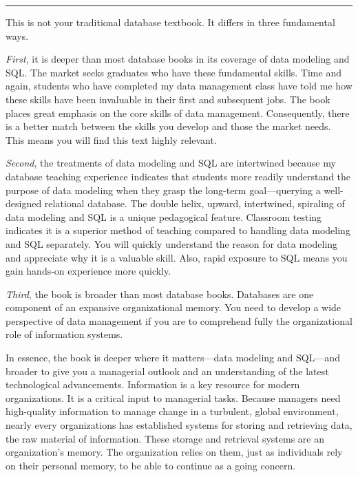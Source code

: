 \documentclass[
]{article}
\begin{document}
\begin{center}\rule{0.5\linewidth}{0.5pt}\end{center}

This is not your traditional database textbook. It differs in three
fundamental ways.

\emph{First}, it is deeper than most database books in its coverage of
data modeling and SQL. The market seeks graduates who have these
fundamental skills. Time and again, students who have completed my data
management class have told me how these skills have been invaluable in
their first and subsequent jobs. The book places great emphasis on the
core skills of data management. Consequently, there is a better match
between the skills you develop and those the market needs. This means
you will find this text highly relevant.

\emph{Second}, the treatments of data modeling and SQL are intertwined
because my database teaching experience indicates that students more
readily understand the purpose of data modeling when they grasp the
long-term goal---querying a well-designed relational database. The
double helix, upward, intertwined, spiraling of data modeling and SQL is
a unique pedagogical feature. Classroom testing indicates it is a
superior method of teaching compared to handling data modeling and SQL
separately. You will quickly understand the reason for data modeling and
appreciate why it is a valuable skill. Also, rapid exposure to SQL means
you gain hands-on experience more quickly.

\emph{Third}, the book is broader than most database books. Databases
are one component of an expansive organizational memory. You need to
develop a wide perspective of data management if you are to comprehend
fully the organizational role of information systems.

In essence, the book is deeper where it matters---data modeling and
SQL---and broader to give you a managerial outlook and an understanding
of the latest technological advancements. Information is a key resource
for modern organizations. It is a critical input to managerial tasks.
Because managers need high-quality information to manage change in a
turbulent, global environment, nearly every organizations has
established systems for storing and retrieving data, the raw material of
information. These storage and retrieval systems are an organization's
memory. The organization relies on them, just as individuals rely on
their personal memory, to be able to continue as a going concern.
\end{document}
